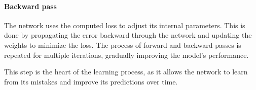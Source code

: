 \paragraph{Backward pass} The network uses the computed loss to adjust its internal parameters. This is done by propagating the error backward through the network and updating the weights to minimize the loss. The process of forward and backward passes is repeated for multiple iterations, gradually improving the model's performance.

This step is the heart of the learning process, as it allows the network to learn from its mistakes and improve its predictions over time.
